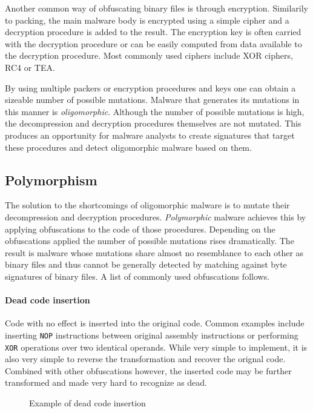 Another common way of obfuscating binary files is through encryption. Similarily to packing, the main malware body is encrypted using a simple cipher and a decryption procedure is added to the result. The encryption key is often carried with the decryption procedure or can be easily computed from data available to the decryption procedure. Most commonly used ciphers include XOR ciphers, RC4 or TEA. 

By using multiple packers or encryption procedures and keys one can obtain a sizeable number of possible mutations. Malware that generates its mutations in this manner is \emph{oligomorphic}. Although the number of possible mutations is high, the decompression and decryption procedures themselves are not mutated. This produces an opportunity for malware analysts to create signatures that target these procedures and detect oligomorphic malware based on them.

\subsection{Polymorphism}
\label{s_polymorph}
The solution to the shortcomings of oligomorphic malware is to mutate their decompression and decryption procedures. \emph{Polymorphic} malware achieves this by applying obfuscations to the code of those procedures. Depending on the obfuscations applied the number of possible mutations rises dramatically. The result is malware whose mutations share almost no resemblance to each other as binary files and thus cannot be generally detected by matching against byte signatures of binary files. A list of commonly used obfuscations follows.

\paragraph*{Dead code insertion}
Code with no effect is inserted into the original code. Common examples include inserting \texttt{NOP} instructions between original assembly instructions or performing \texttt{XOR} operations over two identical operands. While very simple to implement, it is also very simple to reverse the transformation and recover the orignal code. Combined with other obfuscations however, the inserted code may be further transformed and made very hard to recognize as dead.

\begin{figure}[H]
    \centering
    \caption{Example of dead code insertion}
    \label{fig_obf_dci}
\end{figure}

